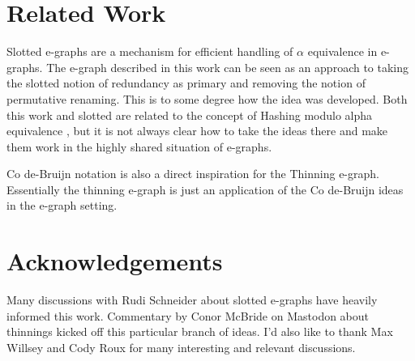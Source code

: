 \documentclass{article}%
\begin{document}







\section{Related Work}

Slotted e-graphs \cite{slotted} are a mechanism for efficient handling of $\alpha$ equivalence in e-graphs. The e-graph described in this work can be seen as an approach to taking the slotted notion of redundancy as primary and removing the notion of permutative renaming. This is to some degree how the idea was developed. Both this work and slotted are related to the concept of Hashing modulo alpha equivalence \cite{hashalpha}, but it is not always clear how to take the ideas there and make them work in the highly shared situation of e-graphs.

Co de-Bruijn notation \cite{McBride_2018} is also a direct inspiration for the Thinning e-graph. Essentially the thinning e-graph is just an application of the Co de-Bruijn ideas in the e-graph setting.

\section{Acknowledgements}
Many discussions with Rudi Schneider about slotted e-graphs have heavily informed this work. Commentary by Conor McBride on Mastodon about thinnings kicked off this particular branch of ideas. I'd also like to thank Max Willsey and Cody Roux for many interesting and relevant discussions.


\end{document}

